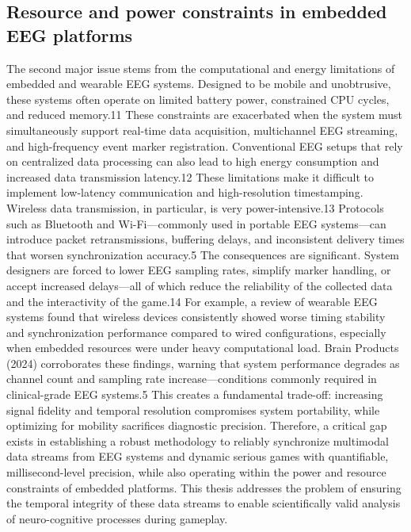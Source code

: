 \subsection{Resource and power constraints in embedded EEG platforms}

The second major issue stems from the computational and energy limitations of embedded and wearable EEG systems. Designed to be mobile and unobtrusive, these systems often operate on limited battery power, constrained CPU cycles, and reduced memory.11 These constraints are exacerbated when the system must simultaneously support real-time data acquisition, multichannel EEG streaming, and high-frequency event marker registration. Conventional EEG setups that rely on centralized data processing can also lead to high energy consumption and increased data transmission latency.12
These limitations make it difficult to implement low-latency communication and high-resolution timestamping. Wireless data transmission, in particular, is very power-intensive.13 Protocols such as Bluetooth and Wi-Fi—commonly used in portable EEG systems—can introduce packet retransmissions, buffering delays, and inconsistent delivery times that worsen synchronization accuracy.5
The consequences are significant. System designers are forced to lower EEG sampling rates, simplify marker handling, or accept increased delays—all of which reduce the reliability of the collected data and the interactivity of the game.14 For example, a review of wearable EEG systems found that wireless devices consistently showed worse timing stability and synchronization performance compared to wired configurations, especially when embedded resources were under heavy computational load.
Brain Products (2024) corroborates these findings, warning that system performance degrades as channel count and sampling rate increase—conditions commonly required in clinical-grade EEG systems.5 This creates a fundamental trade-off: increasing signal fidelity and temporal resolution compromises system portability, while optimizing for mobility sacrifices diagnostic precision.
Therefore, a critical gap exists in establishing a robust methodology to reliably synchronize multimodal data streams from EEG systems and dynamic serious games with quantifiable, millisecond-level precision, while also operating within the power and resource constraints of embedded platforms. This thesis addresses the problem of ensuring the temporal integrity of these data streams to enable scientifically valid analysis of neuro-cognitive processes during gameplay.


